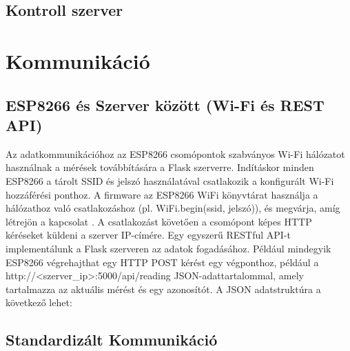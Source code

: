 \subsection{Kontroll szerver}

\section{Kommunikáció}

\subsection{ESP8266 és Szerver között (Wi-Fi és REST API)}

Az adatkommunikációhoz az ESP8266 csomópontok szabványos Wi-Fi hálózatot használnak a mérések továbbítására 
a Flask szerverre. Indításkor minden ESP8266 a tárolt SSID és jelszó használatával csatlakozik a konfigurált 
Wi-Fi hozzáférési ponthoz. A firmware az ESP8266 WiFi könyvtárat használja a hálózathoz való csatlakozáshoz 
(pl. WiFi.begin(ssid, jelszó)), és megvárja, amíg létrejön a kapcsolat
\cite{techtutorialsx:esp8266flask}
. A csatlakozást követően a csomópont képes HTTP kéréseket küldeni a szerver IP-címére. Egy egyszerű RESTful API-t implementálunk a Flask szerveren az adatok fogadásához. Például mindegyik ESP8266 végrehajthat egy HTTP POST kérést egy végponthoz, például a http://<szerver_ip>:5000/api/reading JSON-adattartalommal, amely tartalmazza az aktuális mérést és egy azonosítót. A JSON adatstruktúra a következő lehet:

\subsection{Standardizált Kommunikáció}
